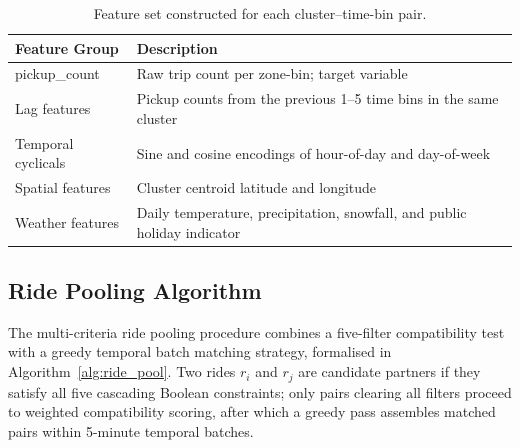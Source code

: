 \documentclass[a4paper,fleqn]{cas-dc}
\begin{document}
\begin{table}[t]
\centering
\caption{Feature set constructed for each cluster--time-bin pair.\label{tab:features}}
\begin{tabularx}{\linewidth}{>{\raggedright\arraybackslash}p{3.2cm} >{\raggedright\arraybackslash}X}
\toprule
\textbf{Feature Group} & \textbf{Description} \\
\midrule
pickup\_count & Raw trip count per zone-bin; target variable \\
Lag features & Pickup counts from the previous 1--5 time bins in the same cluster \\
Temporal cyclicals & Sine and cosine encodings of hour-of-day and day-of-week \\
Spatial features & Cluster centroid latitude and longitude \\
Weather features & Daily temperature, precipitation, snowfall, and public holiday indicator \\
\bottomrule
\end{tabularx}
\end{table}

\subsection{Ride Pooling Algorithm}
\label{sec:pooling}

The multi-criteria ride pooling procedure combines a five-filter compatibility test with a greedy temporal batch matching strategy, formalised in Algorithm~\ref{alg:ride_pool}.  Two rides $r_i$ and $r_j$ are candidate partners if they satisfy all five cascading Boolean constraints; only pairs clearing all filters proceed to weighted compatibility scoring, after which a greedy pass assembles matched pairs within 5-minute temporal batches.
\end{document}
